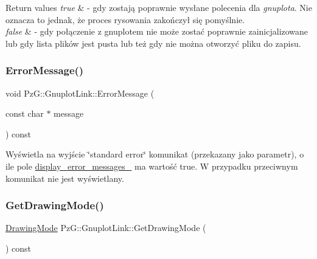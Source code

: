 \begin{DoxyRetVals}{Return values}
{\em true} & -\/ gdy zostają poprawnie wysłane polecenia dla {\itshape gnuplota}. Nie oznacza to jednak, że proces rysowania zakończył się pomyślnie. \\
\hline
{\em false} & -\/ gdy połączenie z gnuplotem nie może zostać poprawnie zainicjalizowane lub gdy lista plików jest pusta lub też gdy nie można otworzyć pliku do zapisu. \\
\hline
\end{DoxyRetVals}
\mbox{\label{class_pz_g_1_1_gnuplot_link_a863bdb229a0d3e6d8d22cd5a4518d55e}} 
\subsubsection{\texorpdfstring{Error\+Message()}{ErrorMessage()}}
{\footnotesize\ttfamily void Pz\+G\+::\+Gnuplot\+Link\+::\+Error\+Message (\begin{DoxyParamCaption}\item[{const char $\ast$}]{message }\end{DoxyParamCaption}) const\hspace{0.3cm}{\ttfamily [protected]}}

Wyświetla na wyjście \char`\"{}standard error\char`\"{} komunikat (przekazany jako parametr), o ile pole \hyperlink{class_pz_g_1_1_gnuplot_link_adefdb7c360e54c586b1d6bd1fa5c6eee}{display\+\_\+error\+\_\+messages\+\_\+} ma wartość {\ttfamily true}. W przypadku przeciwnym komunikat nie jest wyświetlany. \mbox{\label{class_pz_g_1_1_gnuplot_link_acbeb26baf4b1091dd9243d9cdba8f612}} 
\subsubsection{\texorpdfstring{Get\+Drawing\+Mode()}{GetDrawingMode()}}
{\footnotesize\ttfamily \hyperlink{namespace_pz_g_a4360c76a1dbf714a19a0d97fe56e0660}{Drawing\+Mode} Pz\+G\+::\+Gnuplot\+Link\+::\+Get\+Drawing\+Mode (\begin{DoxyParamCaption}{ }\end{DoxyParamCaption}) const\hspace{0.3cm}{\ttfamily [inline]}}



